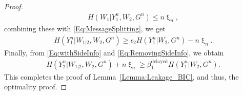 \begin{proof}
\begin{align}
H\left( W_1 | Y_1^n, W_2, G^n \right) \leq n \upxi_n,
\end{align}
combining these with \eqref{Eq:MessageSplitting}, we get
\begin{align}
\label{Eq:RemovingSideInfo}
H\left( Y_1^n | W_{1|2}, W_2, G^n \right)  \geq \epsilon_2 H\left( Y_1^n | W_2, G^n \right) - n \upxi_n.
\end{align}
Finally, from \eqref{Eq:withSideInfo} and \eqref{Eq:RemovingSideInfo}, we obtain
\begin{align}
H\left( Y_2^n | W_{1|2}, W_2, G^n \right) + n \upxi_n \geq \beta_1^{\mathrm{delayed}} H\left( Y_1^n | W_2, G^n \right).
\end{align}
This completes the proof of Lemma~\ref{Lemma:Leakage_BIC}, and thus, the optimality proof.
\end{proof}